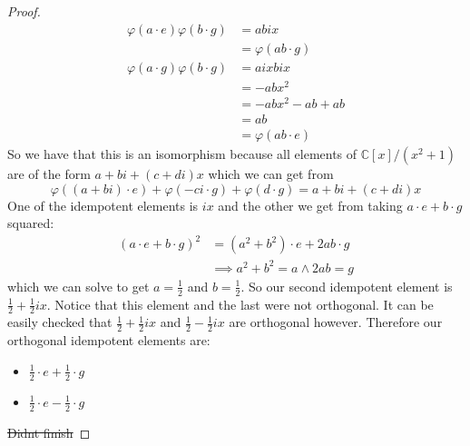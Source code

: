 \documentclass{article}
\begin{document}
\begin{proof}
\begin{align*}
                \varphi(a \cdot e)\varphi(b \cdot g) &= abix                \\
                                                     &= \varphi(ab \cdot g) \\
                \varphi(a \cdot g)\varphi(b \cdot g) &= aixbix              \\
                                                     &= -abx^{2}            \\
                                                     &= -abx^{2} - ab + ab  \\
                                                     &= ab                  \\
                                                     &= \varphi(ab \cdot e)   
            \end{align*}
        So we have that this is an isomorphism because all elements of $\mathbb{C}[x]/(x^{2} + 1)$ are of the form $a + bi + (c + di)x$ which we can get from 
            \begin{equation*}
                \varphi((a + bi) \cdot e) + \varphi(-ci \cdot g) + \varphi(d \cdot g) = a + bi + (c + di)x
            \end{equation*}
        One of the idempotent elements is $ix$ and the other we get from taking $a \cdot e + b \cdot g$ squared:
            \begin{align*}
                (a \cdot e + b \cdot g)^{2} &=                                        (a^{2} + b^{2}) \cdot e + 2ab \cdot g \\
                                            &\implies a^{2} + b^{2} = a \land 2ab = g                                         
            \end{align*}
        which we can solve to get $a = \frac{1}{2}$ and $b = \frac{1}{2}$. So our second idempotent element is $\frac{1}{2} + \frac{1}{2}ix$. Notice that this element and the last were not orthogonal. It can be easily checked that $\frac{1}{2} + \frac{1}{2}ix$ and $\frac{1}{2} - \frac{1}{2}ix$ are orthogonal however. Therefore our orthogonal idempotent elements are:
            \begin{itemize}
                \item $\frac{1}{2} \cdot e + \frac{1}{2} \cdot g$ 

                \item $\frac{1}{2} \cdot e - \frac{1}{2} \cdot g$
            \end{itemize}
        \st{Didnt finish} 
\end{proof}
\end{document}
